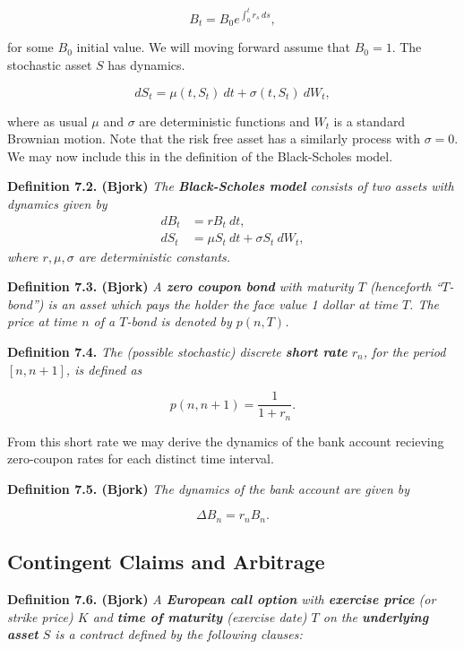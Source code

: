 \documentclass[
]{book}
\begin{document}
\[
B_t=B_0e^{\int_0^tr_s\ ds},
\]

for some \(B_0\) initial value. We will moving forward assume that \(B_0=1\). The stochastic asset \(S\) has dynamics.

\[
dS_t=\mu(t,S_t)\ dt + \sigma(t,S_t)\ dW_t,\tag{7.2}
\]

where as usual \(\mu\) and \(\sigma\) are deterministic functions and \(W_t\) is a standard Brownian motion. Note that the risk free asset has a similarly process with \(\sigma = 0\). We may now include this in the definition of the Black-Scholes model.

\textbf{Definition 7.2. (Bjork)} \emph{The \textbf{Black-Scholes model} consists of two assets with dynamics given by}
\begin{align*}
dB_t&=rB_t\ dt,\tag{7.3}\\
dS_t&=\mu S_t\ dt+\sigma S_t\ dW_t,\tag{7.4}
\end{align*}
\emph{where \(r,\mu,\sigma\) are deterministic constants.}

\textbf{Definition 7.3. (Bjork)} \emph{A \textbf{zero coupon bond} with maturity \(T\) (henceforth ``\(T\)-bond'') is an asset which pays the holder the face value 1 dollar at time \(T\). The price at time \(n\) of a \(T\)-bond is denoted by \(p(n,T)\).}

\textbf{Definition 7.4.} \emph{The (possible stochastic) discrete \textbf{short rate} \(r_n\), for the period \([n,n+1]\), is defined as}

\[
p(n,n+1)=\frac{1}{1+ r_n}.\tag{7.6}
\]

From this short rate we may derive the dynamics of the bank account recieving zero-coupon rates for each distinct time interval.

\textbf{Definition 7.5. (Bjork)} \emph{The dynamics of the bank account are given by}

\[
\Delta B_n=r_n B_n.\tag{7.7}
\]

\hypertarget{contingent-claims-and-arbitrage}{%
\subsection{Contingent Claims and Arbitrage}\label{contingent-claims-and-arbitrage}}

\textbf{Definition 7.6. (Bjork)} \emph{A \textbf{European call option} with \textbf{exercise price} (or strike price) \(K\) and \textbf{time of maturity} (exercise date) \(T\) on the \textbf{underlying asset} \(S\) is a contract defined by the following clauses:}
\end{document}
